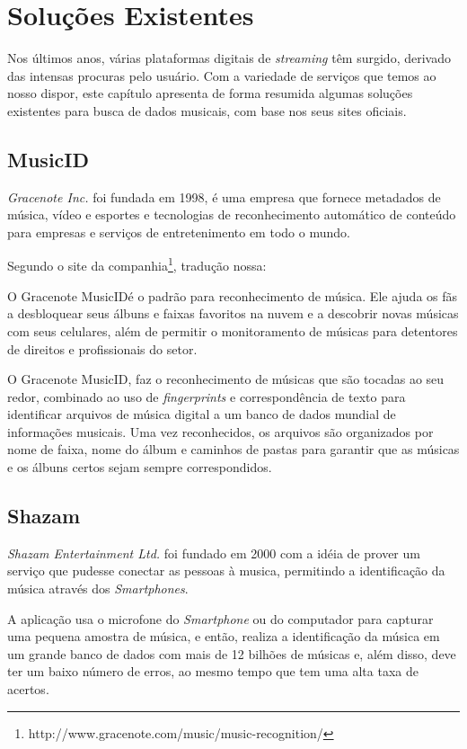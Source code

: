 \chapter{Soluções Existentes}
Nos últimos anos, várias plataformas digitais de \textit{streaming} têm surgido, derivado das intensas procuras pelo usuário. Com a variedade de serviços que temos ao nosso dispor, este capítulo apresenta de forma resumida algumas soluções existentes para busca de dados musicais, com base nos seus sites oficiais.

\section{MusicID}
\textit{Gracenote Inc.} foi fundada em 1998, é uma empresa que fornece metadados de música, vídeo e esportes e tecnologias de reconhecimento automático de conteúdo para empresas e serviços de entretenimento em todo o mundo.

Segundo o site da companhia\footnote{http://www.gracenote.com/music/music-recognition/}, tradução nossa:

\begin{citation}
O Gracenote MusicID\textregistered é o padrão para reconhecimento de música. Ele ajuda os fãs a desbloquear seus álbuns e faixas favoritos na nuvem e a descobrir novas músicas com seus celulares, além de permitir o monitoramento de músicas para detentores de direitos e profissionais do setor.
\end{citation}

O Gracenote MusicID\textregistered, faz o reconhecimento de músicas que são tocadas ao seu redor, combinado ao uso de \textit{fingerprints} e correspondência de texto para identificar arquivos de música digital a um banco de dados mundial de informações musicais. Uma vez reconhecidos, os arquivos são organizados por nome de faixa, nome do álbum e caminhos de pastas para garantir que as músicas e os álbuns certos sejam sempre correspondidos.

\section{Shazam}
\textit{Shazam Entertainment Ltd.} foi fundado em 2000 com a idéia de prover um serviço que pudesse conectar as pessoas à musica, permitindo a identificação da música através dos \textit{Smartphones}.

A aplicação usa o microfone do \textit{Smartphone} ou do computador para capturar uma pequena amostra de música, e então, realiza a identificação da música em um grande banco de dados com mais de 12 bilhões de músicas e, além disso, deve ter um baixo número de erros, ao mesmo tempo que tem uma alta taxa de acertos.

